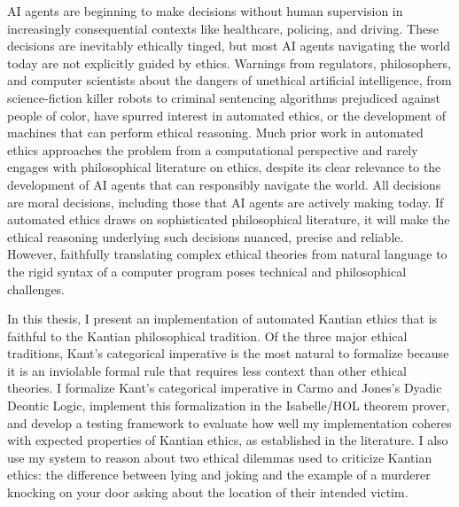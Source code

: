 %
\begin{isabellebody}%
%
%
\isadelimtheory
%
\endisadelimtheory
%
\isatagtheory
%
\endisatagtheory
{\isafoldtheory}%
%
\isadelimtheory
%
\endisadelimtheory
%
\begin{isamarkuptext}%
AI agents are beginning to make decisions without human supervision in increasingly consequential 
contexts like healthcare, policing, and driving. These decisions are inevitably ethically tinged, 
but most AI agents navigating the world today are not explicitly guided by ethics.
Warnings from regulators, philosophers, and computer scientists about the 
dangers of unethical artificial intelligence, from science-fiction killer robots to criminal
sentencing algorithms prejudiced against people of color, have spurred interest in automated ethics, or the development 
of machines that can perform ethical reasoning. Much prior work in automated ethics approaches the 
problem from a computational perspective and rarely engages with philosophical literature on ethics, despite
its clear relevance to the development of AI agents that can
responsibly navigate the world. All decisions are moral decisions, including those that AI agents are actively 
making today. If automated ethics draws on sophisticated philosophical literature, it will make the ethical reasoning
underlying such decisions nuanced, precise and reliable. However, faithfully translating complex ethical theories
from natural language to the rigid syntax of a computer program poses technical and philosophical 
challenges. 

In this thesis, I present an implementation of automated Kantian
ethics that is faithful to the Kantian philosophical tradition. Of the three major ethical
traditions, Kant's categorical imperative is the most natural to formalize because it is an inviolable 
formal rule that requires less context than other ethical theories. I formalize Kant's categorical imperative 
in Carmo and Jones's Dyadic Deontic Logic, implement this formalization 
in the Isabelle/HOL theorem prover, and develop a testing framework to evaluate how well 
my implementation coheres with expected properties of Kantian ethics, as established in the literature. 
I also use my system to reason about two ethical dilemmas used to criticize Kantian ethics: the difference
between lying and joking and the example of a murderer knocking on your door asking about the location of their
intended victim. 


\end{isamarkuptext}
\end{isabellebody}
